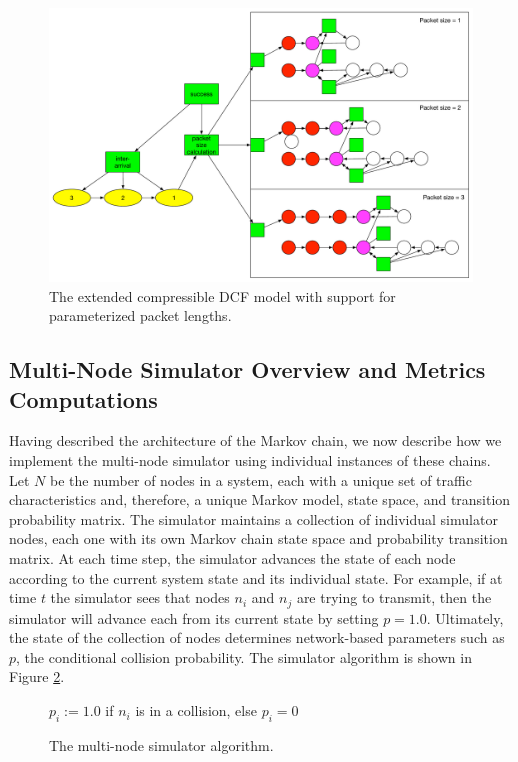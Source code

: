 \documentclass{llncs}
\begin{document}
\begin{figure}
\begin{center}
\includegraphics[scale=0.35]{../../sketches/compressible_dcf_all.pdf}
\caption{The extended compressible DCF model with support for parameterized packet lengths.}
\label{fig:compressible_dcf_all}
\end{center}
\end{figure}

\subsection{Multi-Node Simulator Overview and Metrics Computations}

Having described the architecture of the Markov chain, we now describe how we implement the multi-node simulator using individual instances of these chains. Let $N$ be the number of nodes in a system, each with a unique set of traffic characteristics and, therefore, a unique Markov model, state space, and transition probability matrix. The simulator maintains a collection of individual simulator nodes, each one with its own Markov chain state space and probability transition matrix. At each time step, the simulator advances the state of each node according to the current system state and its individual state. For example, if at time $t$ the simulator sees that nodes $n_i$ and $n_j$ are trying to transmit, then the simulator will advance each from its current state by setting $p = 1.0$. Ultimately, the state of the collection of nodes determines network-based parameters such as $p$, the conditional collision probability. The simulator algorithm is shown in Figure \ref{alg:simulator}. 

\begin{figure}
\begin{algorithmic}
		\STATE $p_i := 1.0$ if $n_i$ is in a collision, else $p_i = 0$
	\ENDFOR
\ENDFOR
\end{algorithmic}
\caption{The multi-node simulator algorithm.}
\label{alg:simulator}
\end{figure}
\end{document}
